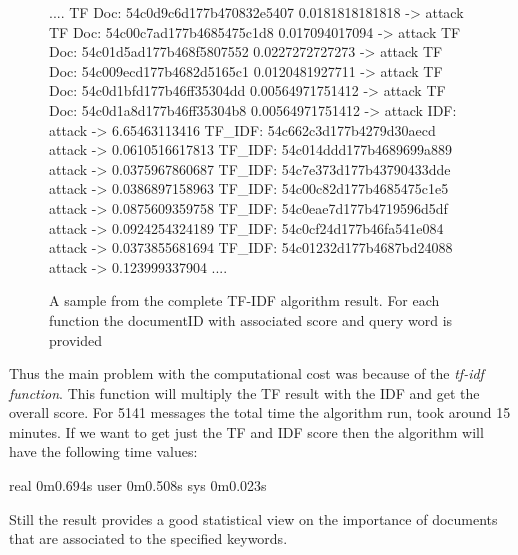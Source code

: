 \documentclass[12pt]{article}
\begin{document}
\begin{figure}[h!] 
\begin{footnotesize} 
\begin{spverbatim}
....
TF Doc: 54c0d9c6d177b470832e5407 0.0181818181818 -> attack
TF Doc: 54c00c7ad177b4685475c1d8 0.017094017094 -> attack
TF Doc: 54c01d5ad177b468f5807552 0.0227272727273 -> attack
TF Doc: 54c009ecd177b4682d5165c1 0.0120481927711 -> attack
TF Doc: 54c0d1bfd177b46ff35304dd 0.00564971751412 -> attack
TF Doc: 54c0d1a8d177b46ff35304b8 0.00564971751412 -> attack
IDF:  attack -> 6.65463113416
TF_IDF:  54c662c3d177b4279d30aecd attack -> 0.0610516617813
TF_IDF:  54c014ddd177b4689699a889 attack -> 0.0375967860687
TF_IDF:  54c7e373d177b43790433dde attack -> 0.0386897158963
TF_IDF:  54c00c82d177b4685475c1e5 attack -> 0.0875609359758
TF_IDF:  54c0eae7d177b4719596d5df attack -> 0.0924254324189
TF_IDF:  54c0cf24d177b46fa541e084 attack -> 0.0373855681694
TF_IDF:  54c01232d177b4687bd24088 attack -> 0.123999337904
....
\end{spverbatim}
\captionsetup{font=small}
\caption{A sample from the complete TF-IDF algorithm result. For each function the documentID with associated score and query word is provided}
\end{footnotesize}
\end{figure}
Thus the main problem with the computational cost was because of the \textit{tf-idf function}. This function will multiply the TF result with the IDF and get the overall score. For 5141 messages the total time the algorithm run, took around 15 minutes. If we want to get just the TF and IDF score then the algorithm will have the following time values:
\begin{spverbatim}
real	0m0.694s
user	0m0.508s
sys	0m0.023s
\end{spverbatim}
\hfill \break 
Still the result provides a good statistical view on the importance of documents that are associated to the specified keywords. 
\hfill \break 
\end{document}
